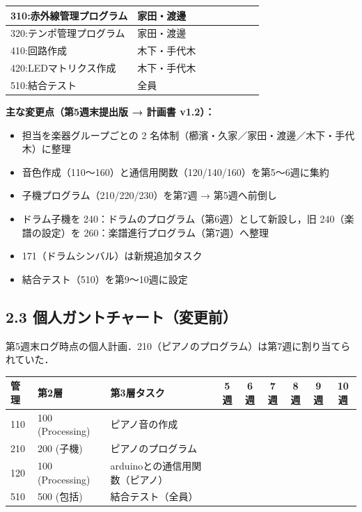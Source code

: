 \documentclass[a4paper,11pt]{ltjsarticle}
\providecommand{\％}{\%}
\begin{document}
\begin{longtable}{|p{6.2cm}|p{2.3cm}|c|c|c|c|c|c|}
\hline
310:赤外線管理プログラム & 家田・渡邊 & & \cellcolor{ganttCell} & \cellcolor{ganttCell} & & & \\
\hline
320:テンポ管理プログラム & 家田・渡邊 & & & \cellcolor{ganttCell} & \cellcolor{ganttCell} & & \\
\hline
410:回路作成 & 木下・手代木 & & \cellcolor{ganttCell} & & & & \\
\hline
420:LEDマトリクス作成 & 木下・手代木 & & \cellcolor{ganttCell} & \cellcolor{ganttCell} & \cellcolor{ganttCell} & & \\
\hline
510:結合テスト & 全員 & & & & & \cellcolor{ganttCell} & \cellcolor{ganttCell} \\
\hline
\end{longtable}

\endgroup

\textbf{主な変更点（第5週末提出版 → 計画書 v1.2）：}
\begin{itemize}
    \item 担当を楽器グループごとの 2 名体制（櫛濱・久家／家田・渡邊／木下・手代木）に整理
    \item 音色作成（110〜160）と通信用関数（120/140/160）を第5〜6週に集約
    \item 子機プログラム（210/220/230）を第7週 → 第5週へ前倒し
    \item ドラム子機を 240：ドラムのプログラム（第6週）として新設し，旧 240（楽譜の設定）を 260：楽譜進行プログラム（第7週）へ整理
    \item 171（ドラムシンバル）は新規追加タスク
    \item 結合テスト（510）を第9〜10週に設定
\end{itemize}

\subsection*{2.3 個人ガントチャート（変更前）}

第5週末ログ時点の個人計画．210（ピアノのプログラム）は第7週に割り当てられていた．

\begin{longtable}{|p{0.9cm}|p{2.0cm}|p{6.0cm}|c|c|c|c|c|c|}
\hline
\rowcolor[gray]{0.9}
管理 & 第2層 & 第3層タスク & 5週 & 6週 & 7週 & 8週 & 9週 & 10週 \\
\hline
110 & 100 (Processing) & ピアノ音の作成 & \cellcolor{ganttCell} & \cellcolor{ganttCell} & & & & \\
\hline
210 & 200 (子機) & ピアノのプログラム & & & \cellcolor{ganttCell} & & & \\
\hline
120 & 100 (Processing) & arduinoとの通信用関数（ピアノ） & & & & \cellcolor{ganttCell} & \cellcolor{ganttCell} & \\
\hline
510 & 500 (包括) & 結合テスト（全員） & & & & & & \cellcolor{ganttCell} \\
\hline
\end{longtable}
\end{document}
